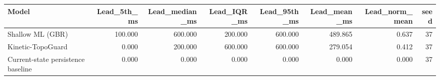 \begin{tabular}{lrrrrrrr}
\toprule
Model & Lead\_5th\_ms & Lead\_median\_ms & Lead\_IQR\_ms & Lead\_95th\_ms & Lead\_mean\_ms & Lead\_norm\_mean & seed \\
\midrule
Shallow ML (GBR) & 100.000 & 600.000 & 200.000 & 600.000 & 489.865 & 0.637 & 37 \\
Kinetic-TopoGuard & 0.000 & 200.000 & 600.000 & 600.000 & 279.054 & 0.412 & 37 \\
Current-state persistence baseline & 0.000 & 0.000 & 0.000 & 0.000 & 0.000 & 0.000 & 37 \\
\bottomrule
\end{tabular}